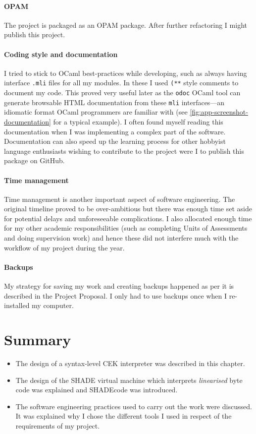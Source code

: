 \documentclass[class=article, crop=false]{standalone}
\begin{document}
\paragraph{OPAM}

The project is packaged as an OPAM package. After further refactoring I might publish this project.

\paragraph{Coding style and documentation}

I tried to stick to OCaml best-practices while developing, such as always
having interface \verb|.mli| files for all my modules.
In these I used \verb|(**| style comments to document my code. This proved very
useful later as the \verb|odoc| OCaml tool can generate browsable HTML
documentation from these \verb|mli| interfaces---an idiomatic format OCaml
programmers are familiar with (see \autoref{fig:app-screenshot-documentation} for a typical example).
I often found myself reading this documentation when I was implementing a complex
part of the software. Documentation can also speed up the learning
process for other hobbyist language enthusiasts wishing to contribute to the
project were I to publish this package on GitHub.

\paragraph{Time management}

Time management is another important aspect of software engineering. The original
timeline proved to be over-ambitious but there was enough time set aside for
potential delays and unforeseeable complications. I also allocated enough time
for my other academic responsibilities (such as completing Units of Assessments
and doing supervision work) and hence these did not interfere much with the
workflow of my project during the year.

\paragraph{Backups}

My strategy for saving my work and creating backups happened as per it is
described in the Project Proposal. I only had to use backups once when I
re-installed my computer.

\section{Summary}
\begin{itemize}
\item The design of a syntax-level CEK interpreter was described in this chapter.
\item The design of the SHADE virtual machine which interprets \emph{linearised}
byte code was explained and SHADEcode was introduced.
\item The software engineering practices used to carry out the work were discussed.
It was explained why I chose the different tools I used in respect of the
requirements of my project.
\end{itemize}
\end{document}

